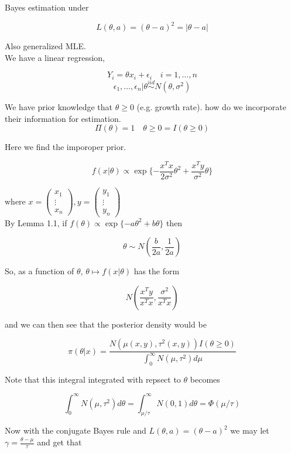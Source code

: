 \documentclass[11pt,fleqn]{book} %
\begin{document}
\begin{example}
 	Bayes estimation under 

 			$$L(\theta, a) = (\theta - a)^2 = |\theta  - a|$$

 	Also generalized MLE. \\

 	We have a linear regression, 

 			$$Y_i = \theta x_i + \epsilon_i \quad i = 1, \dots, n $$
 			$$\epsilon_1, \dots, \epsilon_n | \theta \stackrel{iid}{\sim} N(\theta, \sigma^2) $$

 	We have prior knowledge that $\theta \geq 0$ (e.g. growth rate). how do we incorporate their information for estimation.\\

 			$$\Pi(\theta) = 1 \quad \theta \geq 0 = I(\theta \geq 0) $$

 	Here we find the imporoper prior.  

 			$$f(x|\theta) \propto \exp\{- \frac{x^T x}{2 \sigma^2} \theta^2 + \frac{x^T y}{\sigma^2}\theta\} $$ 


where $x = \begin{pmatrix}
	x_1\\
	\vdots\\
	x_n
\end{pmatrix}, y = \begin{pmatrix}
	y_1\\
	\vdots\\
	y_n
\end{pmatrix}$\\

By Lemma 1.1, if $f(\theta) \propto \exp\{-a \theta^2 + b \theta\}$ then 

		$$\theta \sim N(\frac{b}{2a}, \frac{1}{2a}) $$

So, as a function of $\theta$, $\theta \mapsto f(x|\theta)$ has the form 

		$$N(\frac{x^T y}{x^T x}, \frac{\sigma^2}{x^T x}) $$

and we can then see that the posterior density would be 

		$$\pi(\theta|x) = \frac{N(\mu(x, y), \tau^2(x, y)) I(\theta \geq 0)}{\int^\infty_0 N(\mu, \tau^2) d\mu} $$

Note that this integral integrated with repsect to $\theta$ becomes 

		$$\int^\infty_0 N(\mu, \tau^2) d\theta = \int ^\infty_{\mu / \tau} N(0,1)d\theta = \Phi(\mu/\tau) $$

Now with the conjugate Bayes rule and $L(\theta, a) = (\theta- a)^2$ we may let $\gamma = \frac{\theta - \mu}{\tau}$ and get that


\end{example}
\end{document}
